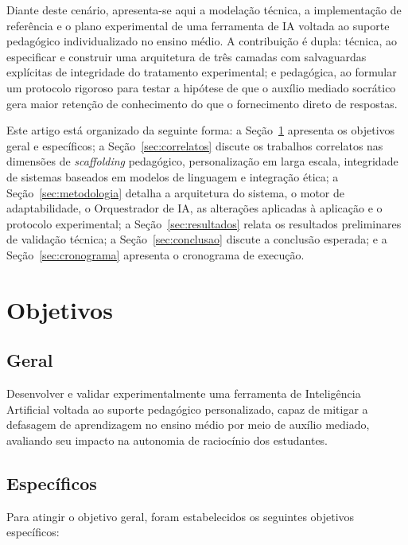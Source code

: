 \documentclass[10pt, a4paper, twocolumn]{article}
\begin{document}
Diante deste cenário, apresenta-se aqui a modelação técnica, a implementação de
referência e o plano experimental de uma ferramenta de IA voltada ao suporte
pedagógico individualizado no ensino médio. A contribuição é dupla: técnica, ao
especificar e construir uma arquitetura de três camadas com salvaguardas
explícitas de integridade do tratamento experimental; e pedagógica, ao formular
um protocolo rigoroso para testar a hipótese de que o auxílio mediado socrático
gera maior retenção de conhecimento do que o fornecimento direto de respostas.

Este artigo está organizado da seguinte forma: a Seção~\ref{sec:objetivos}
apresenta os objetivos geral e específicos; a Seção~\ref{sec:correlatos} discute
os trabalhos correlatos nas dimensões de \textit{scaffolding} pedagógico,
personalização em larga escala, integridade de sistemas baseados em modelos de
linguagem e integração ética; a Seção~\ref{sec:metodologia} detalha a arquitetura
do sistema, o motor de adaptabilidade, o Orquestrador de IA, as alterações
aplicadas à aplicação e o protocolo experimental; a
Seção~\ref{sec:resultados} relata os resultados preliminares de validação
técnica; a Seção~\ref{sec:conclusao} discute a conclusão esperada; e a
Seção~\ref{sec:cronograma} apresenta o cronograma de execução.

\section{Objetivos}
\label{sec:objetivos}

\subsection{Geral}

Desenvolver e validar experimentalmente uma ferramenta de Inteligência
Artificial voltada ao suporte pedagógico personalizado, capaz de mitigar a
defasagem de aprendizagem no ensino médio por meio de auxílio mediado,
avaliando seu impacto na autonomia de raciocínio dos estudantes.

\subsection{Específicos}

Para atingir o objetivo geral, foram estabelecidos os seguintes objetivos
específicos:
\end{document}

